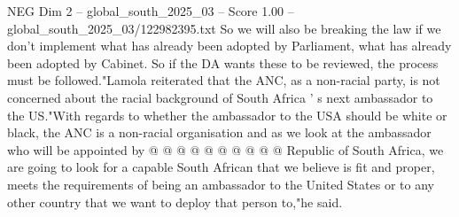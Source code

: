 \begin{textsample}{NEG Dim 2 – global\_south\_2025\_03 – Score 1.00 – global\_south\_2025\_03/122982395.txt}
So we will also be breaking the law if we don't implement what has already been adopted by Parliament, what has already been adopted by Cabinet.
So if the DA wants these to be reviewed, the process must be followed."Lamola reiterated that the ANC, as a non-racial party, is not concerned about the racial background of South Africa ' s next ambassador to the US."With regards to whether the ambassador to the USA should be white or black, the ANC is a non-racial organisation and as we look at the ambassador who will be appointed by @ @ @ @ @ @ @ @ @ @ Republic of South Africa, we are going to look for a capable South African that we believe is fit and proper, meets the requirements of being an ambassador to the United States or to any other country that we want to deploy that person to,"he said.

\end{textsample}
